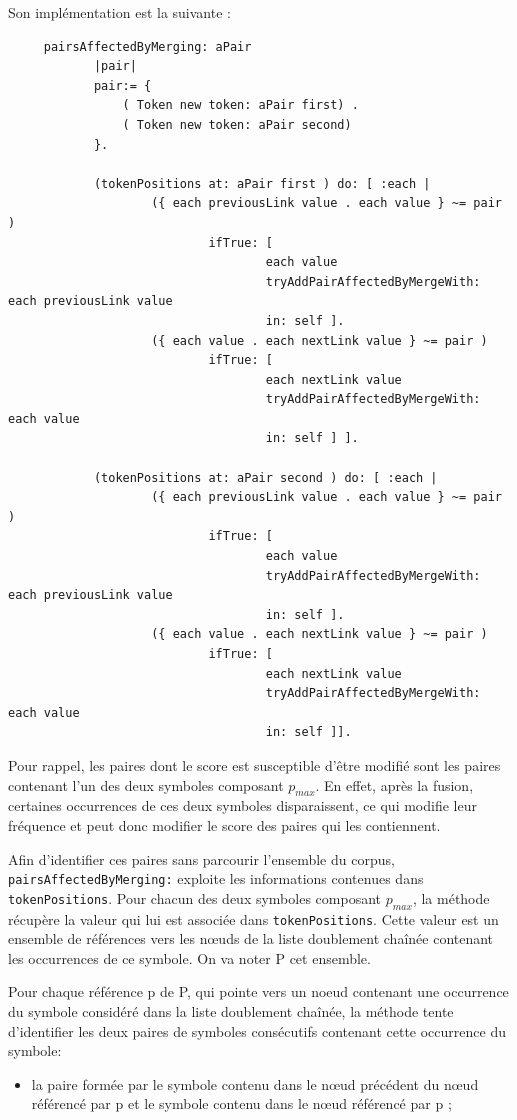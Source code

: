 \documentclass[12pt,a4paper]{report}
\begin{document}
\begin{enumerate}
\begin{enumerate}[label=\alph*)]
	 	Son implémentation est la suivante :
	 	
	 	\begin{verbatim}
	 pairsAffectedByMerging: aPair
	 		|pair|
	 		pair:= {
	 			( Token new token: aPair first) . 
	 			( Token new token: aPair second)
	 		}.
	 		
	 		(tokenPositions at: aPair first ) do: [ :each |
	 				({ each previousLink value . each value } ~= pair )
	 						ifTrue: [
	 								each value
	 								tryAddPairAffectedByMergeWith: each previousLink value
	 								in: self ].
	 				({ each value . each nextLink value } ~= pair )
	 						ifTrue: [
	 								each nextLink value
	 								tryAddPairAffectedByMergeWith: each value
	 								in: self ] ].
	 								
	 		(tokenPositions at: aPair second ) do: [ :each |
	 				({ each previousLink value . each value } ~= pair )
	 						ifTrue: [
	 								each value
	 								tryAddPairAffectedByMergeWith: each previousLink value
	 								in: self ].
	 				({ each value . each nextLink value } ~= pair )
	 						ifTrue: [
	 								each nextLink value
	 								tryAddPairAffectedByMergeWith: each value
	 								in: self ]].
	 	\end{verbatim}
	 	
	 	Pour rappel, les paires dont le score est susceptible d'être modifié sont les paires contenant l'un des deux symboles composant $p_{max}$. En effet, après la fusion, certaines occurrences de ces deux symboles disparaissent, ce qui modifie leur fréquence et peut donc modifier le score des paires qui les contiennent.
	 	
	 	Afin d'identifier ces paires sans parcourir l'ensemble du corpus, \texttt{pairsAffectedByMerging:} exploite les informations contenues dans \texttt{tokenPositions}. Pour chacun des deux symboles composant $p_{max}$, la méthode récupère la valeur qui lui est associée dans \texttt{tokenPositions}. Cette valeur est un ensemble de références vers les nœuds de la liste doublement chaînée contenant les occurrences de ce symbole. On va noter P cet ensemble.
	 	
	 	Pour chaque référence p de P, qui pointe vers un noeud contenant une occurrence du symbole considéré dans la liste doublement chaînée, la méthode tente d'identifier les deux paires de symboles consécutifs contenant cette occurrence du symbole:
	 	
	 	\begin{itemize}
	 		\item la paire formée par le symbole contenu dans le nœud précédent du nœud référencé par p et le symbole contenu dans le nœud référencé par p ;
	 		

\end{itemize}
\end{enumerate}
\end{enumerate}
\end{document}
